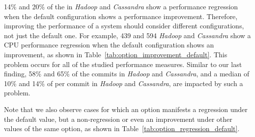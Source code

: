 14\% and 20\% of the \instance in \emph{Hadoop} and \emph{Cassandra} show a performance regression when the default configuration shows a performance improvement. Therefore, improving the performance of a system should consider different configurations, not just the default one. For example, 439 and 594 \emph{Hadoop} and \emph{Cassandra} \instance show a CPU performance regression when the default configuration shows an improvement, as shown in Table~\ref{tab:option_improvement_default}. This problem occurs for all of the studied performance measures. Similar to our last finding, 58\% and 65\% of the commits in \emph{Hadoop} and \emph{Cassandra}, and a median of 10\% and 14\% of \instance per commit in \emph{Hadoop} and \emph{Cassandra}, are impacted by such a problem.

Note that we also observe cases for which an option manifests a regression under the default value, but a non-regression or even an improvement under other values of the same option, as shown in Table~\ref{tab:option_regression_default}. %





